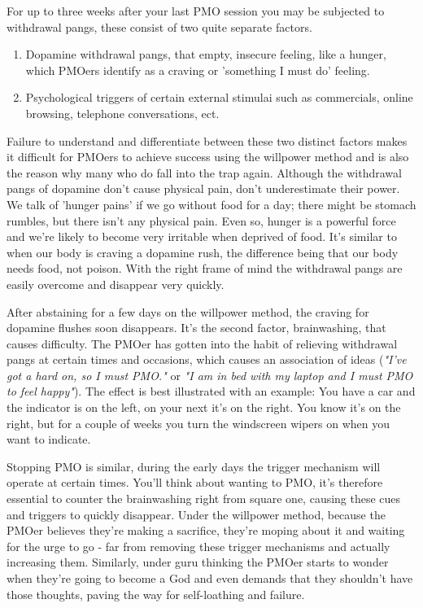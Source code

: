 \documentclass[easypeasy.tex]{subfiles}
\begin{document}
For up to three weeks after your last PMO session you may be subjected to withdrawal pangs, these consist of two quite separate factors.
\begin{enumerate}
  \item Dopamine withdrawal pangs, that empty, insecure feeling, like a hunger, which PMOers identify as a craving or 'something I must do' feeling.

  \item Psychological triggers of certain external stimulai such as commercials, online browsing, telephone conversations, ect.
\end{enumerate}

Failure to understand and differentiate between these two distinct factors makes it difficult for PMOers to achieve success using the willpower method and is also the reason why many who do fall into the trap again. Although the withdrawal pangs of dopamine don't cause physical pain, don't underestimate their power. We talk of 'hunger pains' if we go without food for a day; there might be stomach rumbles, but there isn't any physical pain. Even so, hunger is a powerful force and we're likely to become very irritable when deprived of food. It's similar to when our body is craving a dopamine rush, the difference being that our body needs food, not poison. With the right frame of mind the withdrawal pangs are easily overcome and disappear very quickly.

After abstaining for a few days on the willpower method, the craving for dopamine flushes soon disappears. It's the second factor, brainwashing, that causes difficulty. The PMOer has gotten into the habit of relieving withdrawal pangs at certain times and occasions, which causes an association of ideas (\textit{"I've got a hard on, so I must PMO."} or \textit{"I am in bed with my laptop and I must PMO to feel happy"}). The effect is best illustrated with an example: You have a car and the indicator is on the left, on your next it's on the right. You know it's on the right, but for a couple of weeks you turn the windscreen wipers on when you want to indicate.

Stopping PMO is similar, during the early days the trigger mechanism will operate at certain times. You'll think about wanting to PMO, it's therefore essential to counter the brainwashing right from square one, causing these cues and triggers to quickly disappear. Under the willpower method, because the PMOer believes they're making a sacrifice, they're moping about it and waiting for the urge to go - far from removing these trigger mechanisms and actually increasing them. Similarly, under guru thinking the PMOer starts to wonder when they're going to become a God and even demands that they shouldn't have those thoughts, paving the way for self-loathing and failure.
\end{document}
